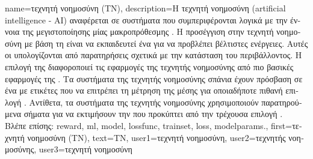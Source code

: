 {name={\foreignlanguage{greek}{τεχνητή νοημοσύνη (ΤΝ)}}, 
	description={\foreignlanguage{greek}{Η τεχνητή νοημοσύνη} (artificial intelligence - AI) 
		\foreignlanguage{greek}{αναφέρεται σε συστήματα που συμπεριφέρονται λογικά με την έννοια της  
		μεγιστοποίησης μίας μακροπρόθεσμης} . \foreignlanguage{greek}{Η προσέγγιση στην τεχνητή νοημοσύνη με βάση
		τη}  \foreignlanguage{greek}{είναι να εκπαιδευτεί ένα}  \foreignlanguage{greek}{για   
		να προβλέπει βέλτιστες ενέργειες. Αυτές οι}  \foreignlanguage{greek}{υπολογίζονται από 
		παρατηρήσεις σχετικά με την κατάσταση του περιβάλλοντος. Η επιλογή της} 
		 \foreignlanguage{greek}{διαφοροποιεί τις εφαρμογές της τεχνητής νοημοσύνης από πιο βασικές  
		εφαρμογές της} . \foreignlanguage{greek}{Τα συστήματα της τεχνητής νοημοσύνης σπάνια έχουν 
		πρόσβαση σε ένα}  \foreignlanguage{greek}{με ετικέτες που να επιτρέπει τη μέτρηση της 
		μέσης}  \foreignlanguage{greek}{για οποιαδήποτε πιθανή επιλογή} . 
		\foreignlanguage{greek}{Αντίθετα, τα συστήματα της τεχνητής νοημοσύνης χρησιμοποιούν παρατηρούμενα σήματα}  
		 \foreignlanguage{greek}{για να εκτιμήσουν την}  \foreignlanguage{greek}{που 
		προκύπτει από την τρέχουσα επιλογή} .\\
		\foreignlanguage{greek}{Βλέπε επίσης:} \gls{reward}, \gls{ml}, \gls{model}, \gls{lossfunc}, \gls{trainset}, \gls{loss}, \gls{modelparams}.},
	first={\foreignlanguage{greek}{τεχνητή νοημοσύνη (ΤΝ)}},
	text={\foreignlanguage{greek}{ΤΝ}},
	user1={\foreignlanguage{greek}{τεχνητή νοημοσύνη}}, %
	user2={\foreignlanguage{greek}{τεχνητής νοημοσύνης}}, %
	user3={\foreignlanguage{greek}{τεχνητή νοημοσύνη}} %
}

